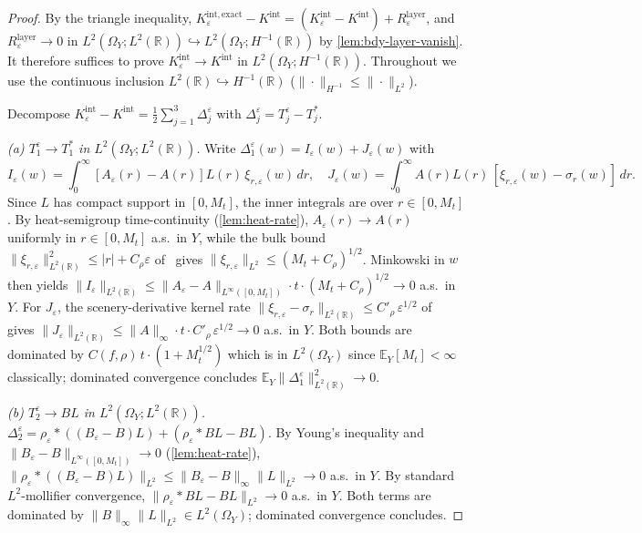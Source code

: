 \documentclass[11pt,reqno]{amsart}
\theoremstyle{plain}
\theoremstyle{definition}
\theoremstyle{remark}
\newcommand{\R}{\mathbb{R}}
\newcommand{\E}{\mathbb{E}}
\begin{document}
\begin{proof}
By the triangle inequality, $K_{\varepsilon}^{\mathrm{int,exact}}-K^{\mathrm{int}}
=(K_{\varepsilon}^{\mathrm{int}}-K^{\mathrm{int}})+R_{\varepsilon}^{\mathrm{layer}}$,
and $R_{\varepsilon}^{\mathrm{layer}}\to 0$ in
$L^{2}(\Omega_{Y};L^{2}(\R))\hookrightarrow L^{2}(\Omega_{Y};H^{-1}(\R))$
by \cref{lem:bdy-layer-vanish}. It therefore suffices to prove
$K_{\varepsilon}^{\mathrm{int}}\to K^{\mathrm{int}}$ in
$L^{2}(\Omega_{Y};H^{-1}(\R))$. Throughout we use the continuous
inclusion $L^{2}(\R)\hookrightarrow H^{-1}(\R)$
($\|\cdot\|_{H^{-1}}\le\|\cdot\|_{L^{2}}$).

Decompose
$K_{\varepsilon}^{\mathrm{int}}-K^{\mathrm{int}}
=\tfrac12\sum_{j=1}^{3}\Delta_{j}^{\varepsilon}$
with $\Delta_{j}^{\varepsilon}=T_{j}^{\varepsilon}-T_{j}^{*}$.

\smallskip\noindent\emph{(a) $T_{1}^{\varepsilon}\to T_{1}^{*}$ in
$L^{2}(\Omega_{Y};L^{2}(\R))$.}
Write $\Delta_{1}^{\varepsilon}(w)=I_{\varepsilon}(w)+J_{\varepsilon}(w)$ with
\[
 I_{\varepsilon}(w)=\!\int_{0}^{\infty}\![A_{\varepsilon}(r)-A(r)]L(r)\,\xi_{r,\varepsilon}(w)\,dr,
 \quad
 J_{\varepsilon}(w)=\!\int_{0}^{\infty}\!A(r)L(r)\,[\xi_{r,\varepsilon}(w)-\sigma_{r}(w)]\,dr.
\]
Since $L$ has compact support in $[0,M_{t}]$, the inner integrals
are over $r\in[0,M_{t}]$. By heat-semigroup time-continuity
(\cref{lem:heat-rate}), $A_{\varepsilon}(r)\to A(r)$ uniformly in
$r\in[0,M_{t}]$ a.s.\ in $Y$, while the bulk bound
$\|\xi_{r,\varepsilon}\|_{L^{2}(\R)}^{2}\le|r|+C_{\rho}\varepsilon$
of~\cite{Fontes-EnergyFirst} gives
$\|\xi_{r,\varepsilon}\|_{L^{2}}\le(M_{t}+C_{\rho})^{1/2}$.
Minkowski in $w$ then yields
$\|I_{\varepsilon}\|_{L^{2}(\R)}\le\|A_{\varepsilon}-A\|_{L^{\infty}([0,M_{t}])}
\cdot t\cdot(M_{t}+C_{\rho})^{1/2}\to 0$ a.s.\ in $Y$.
For $J_{\varepsilon}$, the scenery-derivative kernel rate
$\|\xi_{r,\varepsilon}-\sigma_{r}\|_{L^{2}(\R)}\le C'_{\rho}\,\varepsilon^{1/2}$
of~\cite{Fontes-EnergyFirst} gives
$\|J_{\varepsilon}\|_{L^{2}(\R)}\le\|A\|_{\infty}\cdot t\cdot C'_{\rho}\,\varepsilon^{1/2}\to 0$
a.s.\ in $Y$. Both bounds are dominated by $C(f,\rho)\,t\cdot(1+M_{t}^{1/2})$
which is in $L^{2}(\Omega_{Y})$ since $\E_{Y}[M_{t}]<\infty$
classically; dominated convergence concludes
$\E_{Y}\|\Delta_{1}^{\varepsilon}\|_{L^{2}(\R)}^{2}\to 0$.

\smallskip\noindent\emph{(b) $T_{2}^{\varepsilon}\to BL$ in
$L^{2}(\Omega_{Y};L^{2}(\R))$.}
$\Delta_{2}^{\varepsilon}=\rho_{\varepsilon}*((B_{\varepsilon}-B)L)
+(\rho_{\varepsilon}*BL-BL)$. By Young's inequality and
$\|B_{\varepsilon}-B\|_{L^{\infty}([0,M_{t}])}\to 0$
(\cref{lem:heat-rate}),
$\|\rho_{\varepsilon}*((B_{\varepsilon}-B)L)\|_{L^{2}}\le
\|B_{\varepsilon}-B\|_{\infty}\|L\|_{L^{2}}\to 0$ a.s.\ in $Y$. By
standard $L^{2}$-mollifier convergence,
$\|\rho_{\varepsilon}*BL-BL\|_{L^{2}}\to 0$ a.s.\ in $Y$. Both terms
are dominated by $\|B\|_{\infty}\|L\|_{L^{2}}\in L^{2}(\Omega_{Y})$;
dominated convergence concludes.


\end{proof}
\end{document}
